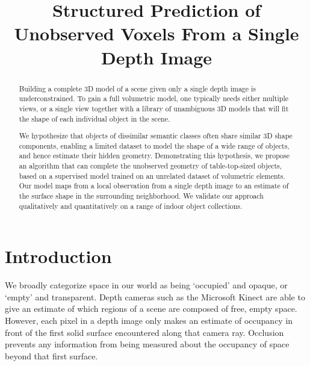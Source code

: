 \documentclass[10pt,twocolumn,letterpaper]{article}
\title{Structured Prediction of Unobserved Voxels From a Single Depth Image}
\begin{document}
\maketitle

\begin{abstract}
Building a complete 3D model of a scene given only a single depth image is underconstrained.
To gain a full volumetric model, one typically needs either multiple views, or a single view together with a library of unambiguous 3D models that will fit the shape of each individual object in the scene.

We hypothesize that objects of dissimilar semantic classes often share similar 3D shape components, enabling a limited dataset to model the shape of a wide range of objects, and hence estimate their hidden geometry.
Demonstrating this hypothesis, we propose an algorithm that can complete the unobserved geometry of table-top-sized objects, based on a supervised model trained on an unrelated dataset of volumetric elements.
Our model maps from a local observation from a single depth image to an estimate of the surface shape in the surrounding neighborhood.
We validate our approach qualitatively and quantitatively on a range of indoor object collections.

\end{abstract}

\section{Introduction}


We broadly categorize space in our world as being `occupied' and opaque, or `empty' and transparent.
Depth cameras such as the Microsoft Kinect are able to give an estimate of which regions of a scene are composed of free, empty space.
However, each pixel in a depth image only makes an estimate of occupancy in front of the first solid surface encountered along that camera ray.
Occlusion prevents any information from being measured about the occupancy of space beyond that first surface.
\end{document}
